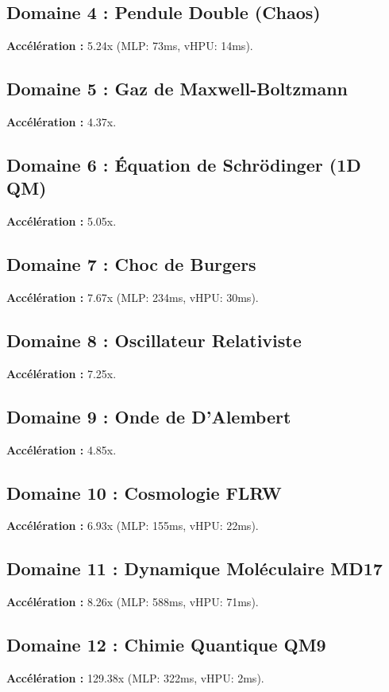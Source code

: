 \documentclass[11pt,a4paper]{article}
\begin{document}
\subsection{Domaine 4 : Pendule Double (Chaos)}
\textbf{Accélération :} 5.24x (MLP: 73ms, vHPU: 14ms).

\subsection{Domaine 5 : Gaz de Maxwell-Boltzmann}
\textbf{Accélération :} 4.37x.

\subsection{Domaine 6 : Équation de Schrödinger (1D QM)}
\textbf{Accélération :} 5.05x.

\subsection{Domaine 7 : Choc de Burgers}
\textbf{Accélération :} 7.67x (MLP: 234ms, vHPU: 30ms).

\subsection{Domaine 8 : Oscillateur Relativiste}
\textbf{Accélération :} 7.25x.

\subsection{Domaine 9 : Onde de D'Alembert}
\textbf{Accélération :} 4.85x.

\subsection{Domaine 10 : Cosmologie FLRW}
\textbf{Accélération :} 6.93x (MLP: 155ms, vHPU: 22ms).

\subsection{Domaine 11 : Dynamique Moléculaire MD17}
\textbf{Accélération :} 8.26x (MLP: 588ms, vHPU: 71ms).

\subsection{Domaine 12 : Chimie Quantique QM9}
\textbf{Accélération :} 129.38x (MLP: 322ms, vHPU: 2ms).
\end{document}
